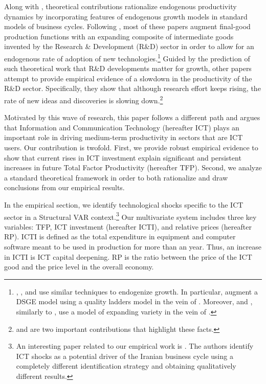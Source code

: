 \documentclass[12pt]{article}
\begin{document}
Along with \cite{comin2006medium}, theoretical contributions rationalize endogenous productivity dynamics by incorporating features of endogenous growth models in standard models of business cycles. Following \cite{romer1990endogenous}, most of these papers augment final-good production functions with an expanding composite of intermediate goods invented by the Research \& Development (R\&D) sector in order to allow for an endogenous rate of adoption of new technologies.\footnote{\cite{bianchi2014growth}, \cite{anzoategui2016endogenous}, and \cite{moran2017innovation} use similar techniques to endogenize growth. In particular, \cite{bianchi2014growth} augment a DSGE  model using a quality ladders model in the vein of \cite{grossman1991quality}. Moreover, \cite{anzoategui2016endogenous} and \cite{moran2017innovation}, similarly to \cite{comin2006medium}, use a model of expanding variety in the vein of \cite{romer1990endogenous}.} Guided by the prediction of such theoretical work that R\&D developments matter for growth, other papers attempt to provide empirical evidence of a slowdown in the productivity of the R\&D sector. Specifically, they show that although research effort keeps rising, the rate of new ideas and discoveries is slowing down.\footnote{\cite{jones2009burden} and \cite{bloom2017ideas} are two important contributions that highlight these facts.}

Motivated by this wave of research, this paper follows a different path and argues that Information and Communication Technology (hereafter ICT) plays an important role in driving medium-term productivity in sectors that are ICT users. Our contribution is twofold. First, we provide robust empirical evidence to show that current rises in ICT investment explain significant and persistent increases in future Total Factor Productivity (hereafter TFP). Second, we analyze a standard theoretical framework in order to both rationalize and draw conclusions from our empirical results. 

In the empirical section, we identify technological shocks specific to the ICT sector in a Structural VAR context.\footnote{An interesting paper related to our empirical work is \cite{jafari2012impact}. The authors identify ICT shocks as a potential driver of the Iranian business cycle using a completely different identification strategy and obtaining qualitatively different results.} Our multivariate system includes three key variables: TFP, ICT investment (hereafter ICTI), and relative prices (hereafter RP). ICTI is defined as the total expenditure in equipment and computer software meant to be used in production for more than an year. Thus, an increase in ICTI is ICT capital deepening. RP is the ratio between the price of the ICT good and the price level in the overall economy. 
\end{document}
